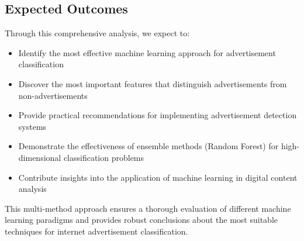 \subsection{Expected Outcomes}
Through this comprehensive analysis, we expect to:

\begin{itemize}
    \item Identify the most effective machine learning approach for advertisement classification
    \item Discover the most important features that distinguish advertisements from non-advertisements
    \item Provide practical recommendations for implementing advertisement detection systems
    \item Demonstrate the effectiveness of ensemble methods (Random Forest) for high-dimensional classification problems
    \item Contribute insights into the application of machine learning in digital content analysis
\end{itemize}

This multi-method approach ensures a thorough evaluation of different machine learning paradigms and provides robust conclusions about the most suitable techniques for internet advertisement classification.